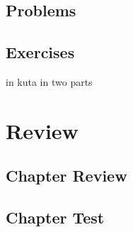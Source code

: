 \subsection{Problems}
\noindent{}

\newpage
\subsection{Exercises}
in kuta in two parts

\newpage
\section{Review}
\subsection{Chapter Review}
\subsection{Chapter Test}